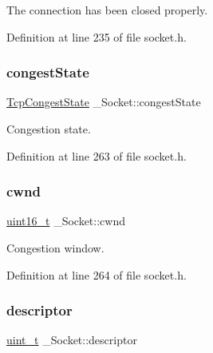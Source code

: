 The connection has been closed properly. 



Definition at line 235 of file socket.\+h.

\mbox{\label{struct__Socket_a4d8b137a67f0a4387a8253f18ad2d8e5}} 
\subsubsection{\texorpdfstring{congest\+State}{congestState}}
{\footnotesize\ttfamily \hyperlink{tcp_8h_ac69e0e40557f11fc979456965cdcd2f1}{Tcp\+Congest\+State} \+\_\+\+Socket\+::congest\+State}



Congestion state. 



Definition at line 263 of file socket.\+h.

\mbox{\label{struct__Socket_a46b793bed82a5d0fbdd301cbb6c6ee90}} 
\subsubsection{\texorpdfstring{cwnd}{cwnd}}
{\footnotesize\ttfamily \hyperlink{stdint_8h_a273cf69d639a59973b6019625df33e30}{uint16\+\_\+t} \+\_\+\+Socket\+::cwnd}



Congestion window. 



Definition at line 264 of file socket.\+h.

\mbox{\label{struct__Socket_adf0f5400b657ecbd6b68014840ffdae4}} 
\subsubsection{\texorpdfstring{descriptor}{descriptor}}
{\footnotesize\ttfamily \hyperlink{compiler__port_8h_a12a1e9b3ce141648783a82445d02b58d}{uint\+\_\+t} \+\_\+\+Socket\+::descriptor}



